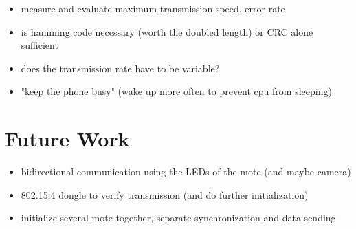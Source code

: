 \documentclass{sig-alternate} %
\begin{document}
\begin{itemize}
	\item measure and evaluate maximum transmission speed, error rate
	\item is hamming code necessary (worth the doubled length) or CRC alone sufficient
	\item does the transmission rate have to be variable?
	\item "keep the phone busy" (wake up more often to prevent cpu from sleeping)
\end{itemize}



\section{Future Work}
\label{sec:future_work}

\begin{itemize}
	\item bidirectional communication using the LEDs of the mote (and maybe camera)
	\item 802.15.4 dongle to verify transmission (and do further initialization)
	\item initialize several mote together, separate synchronization and data sending
\end{itemize}



\end{document}
